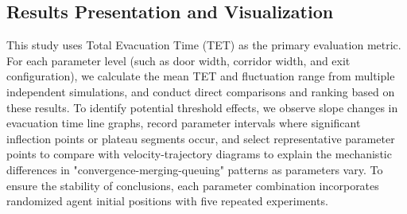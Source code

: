 \subsection{Results Presentation and Visualization}
This study uses Total Evacuation Time (TET) as the primary evaluation metric. For each parameter level (such as door width, corridor width, and exit configuration), we calculate the mean TET and fluctuation range from multiple independent simulations, and conduct direct comparisons and ranking based on these results. To identify potential threshold effects, we observe slope changes in evacuation time line graphs, record parameter intervals where significant inflection points or plateau segments occur, and select representative parameter points to compare with velocity-trajectory diagrams to explain the mechanistic differences in "convergence-merging-queuing" patterns as parameters vary. To ensure the stability of conclusions, each parameter combination incorporates randomized agent initial positions with five repeated experiments.